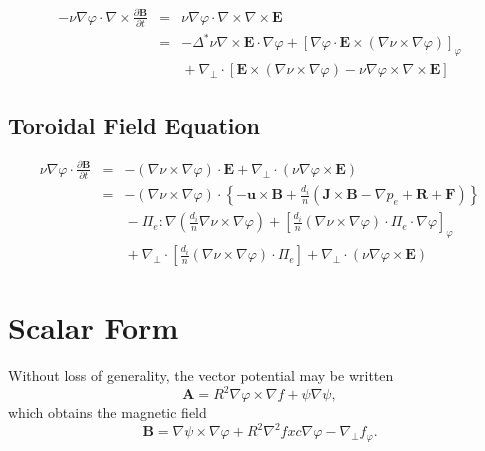 \documentclass[letterpaper]{book}
\newcommand{\ddt}[1]{\frac{\partial #1}{\partial t}}
\renewcommand{\vec}[1]{\ensuremath{\mathbf{#1}}}
\newcommand{\tensor}[1]{\mathsf{#1}}
\newcommand{\tor}{\varphi}              %
\newcommand{\A}{\vec{A}}
\newcommand{\B}{\vec{B}}
\newcommand{\E}{\vec{E}}
\newcommand{\R}{\vec{R}}
\renewcommand{\u}{\vec{u}}
\newcommand{\F}{\vec{F}}
\renewcommand{\j}{\vec{J}}
\renewcommand{\P}{\tensor{\Pi}}
\newcommand{\grad}[1]{\nabla #1}
\newcommand{\gradp}[1]{\nabla_\perp #1}
\newcommand{\divp}[1]{\nabla_\perp \cdot #1}
\newcommand{\curl}[1]{\nabla \times #1}
\newcommand{\gs}[1]{\Delta^* #1}
\newcommand{\lp}[1]{\nabla^2 #1}
\begin{document}
\begin{eqnarray}
  -\nu \grad{\tor} \cdot \curl{\ddt \B} & = & 
  \nu \grad{\tor} \cdot \curl{\curl{\E}}
  \\ \nonumber
   & = & 
  - \gs{\nu} \curl{\E} \cdot \grad{\tor}
  + \left[ \grad{\tor} \cdot \E \times (\grad{\nu} \times \grad{\tor})
    \right]_\tor
  \\ \nonumber & & \mbox{}
  + \divp{\left[ \E \times (\grad{\nu} \times \grad{\tor})
  - \nu \grad{\tor} \times \curl{\E} \right]}
\end{eqnarray}

\subsection{Toroidal Field Equation}

\begin{eqnarray}
  \nu \grad{\tor} \cdot \ddt{\B} & = &
  -(\grad{\nu} \times \grad{\tor}) \cdot \E
  + \divp{(\nu \grad{\tor} \times \E)} 
  \\ \nonumber & = &
  -(\grad{\nu} \times \grad{\tor}) \cdot \left\{
  -\u \times \B + \frac{d_i}{n} \left(
  \j \times \B - \grad{p_e} + \R + \F \right) \right\}
  \\ \nonumber & & \mbox{}
  - \P_e : \grad{ \left( \frac{d_i}{n} \grad{\nu} \times \grad{\tor}
    \right)}
  + \left[ \frac{d_i}{n} (\grad{\nu} \times \grad{\tor}) \cdot \P_e
  \cdot \grad{\tor} \right]_\tor
  \\ \nonumber & & \mbox{}
  + \divp{\left[\frac{d_i}{n} (\grad{\nu} \times \grad{\tor}) \cdot
      \P_e \right]} + \divp{(\nu \grad{\tor} \times \E)}
\end{eqnarray}

\section{Scalar Form}

Without loss of generality, the vector potential may be written
\begin{equation}
  \A = R^2 \grad{\tor} \times \grad{f} + \psi \grad{\psi},
\end{equation}
which obtains the magnetic field
\begin{equation}
  \B = \grad{\psi} \times \grad{\tor} + R^2 \lp{f} xc\grad{\tor} -
  \gradp{f_\tor}.
\end{equation}
\end{document}
